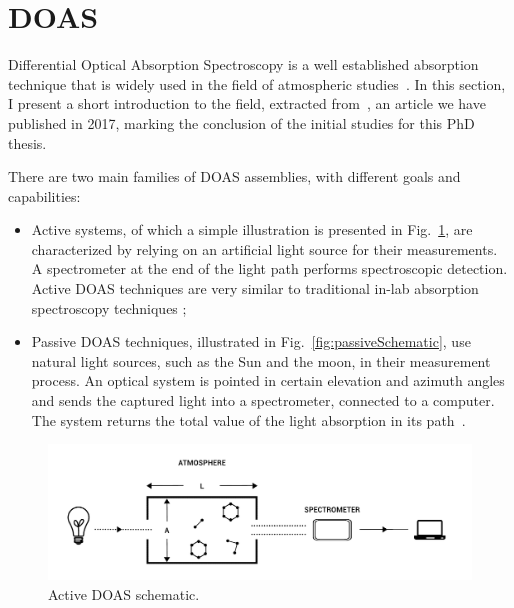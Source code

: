 

\section{DOAS}%
\label{sec:doas}

Differential Optical Absorption Spectroscopy is a well established
absorption technique that is widely used in the field of atmospheric
studies~\cite{Platt2007}. In this section, I present a short
introduction to the field, extracted from~\cite{ValentedeAlmeida2017},
an article we have published in 2017, marking the conclusion of the
initial studies for this PhD thesis.

There are two main families of \gls{DOAS} assemblies, with different
goals and capabilities:

\begin{itemize}

        \item Active systems, of which a simple illustration is
            presented in Fig.~\ref{fig:activeSmall}, are characterized
            by relying on an artificial light source for their
            measurements. A spectrometer at the end of the light path
            performs spectroscopic detection. Active DOAS techniques are
            very similar to traditional in-lab absorption spectroscopy
            techniques \cite{Platt2007};

        \item Passive DOAS techniques, illustrated in
            Fig.~\ref{fig:passiveSchematic}, use natural light sources,
            such as the Sun and the moon, in their measurement process.
            An optical system is pointed in certain elevation and
            azimuth angles and sends the captured light into a
            spectrometer, connected to a computer. The system returns
            the total value of the light absorption in its
            path~\cite{Platt2007,Merlaud2013}.

\end{itemize}

 \begin{figure}[t]
    \includegraphics[width=14cm]{img/pdf/amt-2016-314-f02.pdf}
    \caption{Active DOAS schematic.}\label{fig:activeSmall}
  \end{figure}

